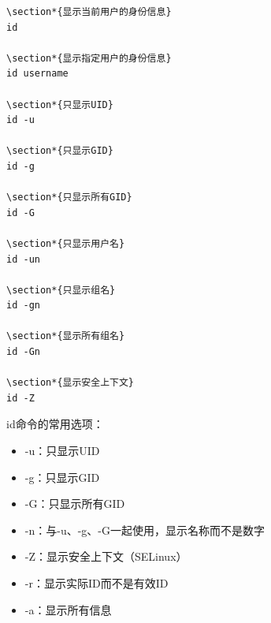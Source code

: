 \documentclass[12pt,UTF8]{ctexbook}
\begin{document}
\begin{verbatim}
\section*{显示当前用户的身份信息}
id

\section*{显示指定用户的身份信息}
id username

\section*{只显示UID}
id -u

\section*{只显示GID}
id -g

\section*{只显示所有GID}
id -G

\section*{只显示用户名}
id -un

\section*{只显示组名}
id -gn

\section*{显示所有组名}
id -Gn

\section*{显示安全上下文}
id -Z
\end{verbatim}

id命令的常用选项：
\begin{itemize}
    \item -u：只显示UID
    \item -g：只显示GID
    \item -G：只显示所有GID
    \item -n：与-u、-g、-G一起使用，显示名称而不是数字
    \item -Z：显示安全上下文（SELinux）
    \item -r：显示实际ID而不是有效ID
    \item -a：显示所有信息
\end{itemize}
\end{document}
